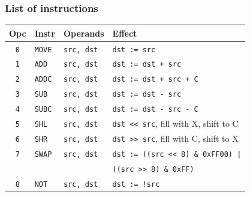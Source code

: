 \documentclass{beamer}
\begin{document}
%
   \begin{frame}
    \frametitle{List of instructions}
    \begin{center}
     \begin{tabular}{|c|ll|l|}
      \hline
       Opc&Instr&Operands&Effect\\
      \hline
       {\tt 0}&{\tt MOVE}&{\tt src, dst}&{\tt dst := src}\\
       {\tt 1}&{\tt ADD}&{\tt src, dst}&{\tt dst := dst + src}\\
       {\tt 2}&{\tt ADDC}&{\tt src, dst}&{\tt dst := dst + src + C}\\
       {\tt 3}&{\tt SUB}&{\tt src, dst}&{\tt dst := dst - src}\\
       {\tt 4}&{\tt SUBC}&{\tt src, dst}&{\tt dst := dst - src - C}\\
       {\tt 5}&{\tt SHL}&{\tt src, dst}&{\tt dst << src}, fill with X, shift to C\\
       {\tt 6}&{\tt SHR}&{\tt src, dst}&{\tt dst >> src}, fill with C, shift to X\\
       {\tt 7}&{\tt SWAP}&{\tt src, dst}&{\tt dst := ((src << 8) \& 0xFF00) |}\\
              &          &              &{\tt ((src >> 8) \& 0xFF)}\\
       {\tt 8}&{\tt NOT}&{\tt src, dst}&{\tt dst := !src}\\
      \hline
     \end{tabular}
    \end{center}
   \end{frame}
%
\end{document}
